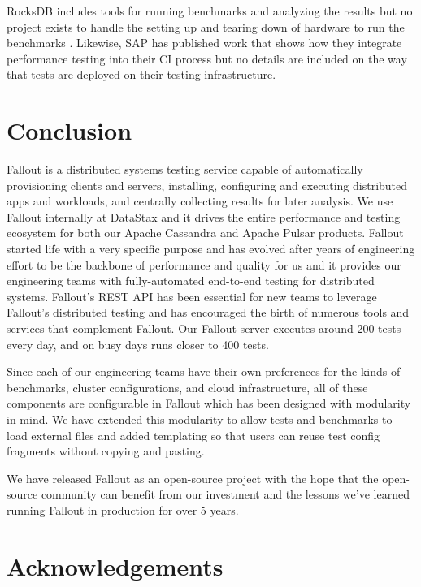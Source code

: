 \documentclass[a4paper,fleqn]{cas-dc}
\begin{document}
RocksDB includes tools for running benchmarks and analyzing the results but no project exists to
handle the setting up and tearing down of hardware to run the benchmarks \cite{ROCKSDB}. Likewise, SAP
has published work that shows how they integrate performance testing into their CI process \cite{SAP} but
no details are included on the way that tests are deployed on their testing infrastructure.

\section{Conclusion}\label{conclusion}

Fallout is a distributed systems testing service capable of automatically provisioning clients and
servers, installing, configuring and executing distributed apps and workloads, and centrally
collecting results for later analysis. We use Fallout internally at DataStax and it drives the
entire performance and testing ecosystem for both our Apache Cassandra and Apache Pulsar products.
Fallout started life with a very specific purpose and has evolved after years of engineering effort
to be the backbone of performance and quality for us and it provides our engineering teams with
fully-automated end-to-end testing for distributed systems. Fallout’s REST API has been essential
for new teams to leverage Fallout’s distributed testing and has encouraged the birth of numerous
tools and services that complement Fallout. Our Fallout server executes around 200 tests every day,
and on busy days runs closer to 400 tests.

Since each of our engineering teams have their own preferences for the kinds of benchmarks, cluster
configurations, and cloud infrastructure, all of these components are configurable in Fallout which
has been designed with modularity in mind. We have extended this modularity to allow tests and
benchmarks to load external files and added templating so that users can reuse test config fragments
without copying and pasting.

We have released Fallout as an open-source project with the hope that the open-source community can
benefit from our investment and the lessons we’ve learned running Fallout in production for over 5
years.

\section{Acknowledgements}\label{acknowledgements}
\end{document}
